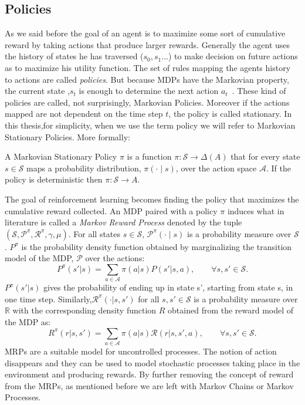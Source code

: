 \subsection{Policies}
As we said before the goal of an agent is to maximize some sort of cumulative reward by taking actions that produce larger rewards. Generally the agent uses the history of states he has traversed ($s_0, s_1...$) to make decision on future actions as to maximize his utility function. The set of rules mapping the agents history to actions are called \emph{policies}. But because MDPs have the Markovian property, the current state ,$s_t$ is enough to determine the next action $a_t$~\cite{Sutton:1998:IRL:551283}. These kind of policies are called, not surprisingly, Markovian Policies. Moreover if the actions mapped are not dependent on the time step $t$, the policy is called stationary. In this thesis,for simplicity, when we use the term policy we will refer to Markovian Stationary Policies. More formally:
\begin{definition}
	A Markovian Stationary Policy $\pi$ is a function $\pi:\mathcal{S}\rightarrow \Delta(A)$ that for every state $s \in \mathcal{S}$ maps a probability distribution, $\pi(\cdot \mid s)$, over the action space $\mathcal{A}$. If the policy is deterministic then $\pi:\mathcal{S}\rightarrow A$.
\end{definition}
The goal of reinforcement learning becomes finding the policy that maximizes the cumulative reward collected.
An MDP paired with a policy $\pi$ induces what in literature is called a \emph{Markov Reward Process} denoted by the tuple $\mathcal{(S,P^\pi,R^\pi,\gamma,\mu)}$. For all states $s \in \mathcal{S}$, $\mathcal{P^\pi}(\cdot \mid s)$ is a probability measure over $\mathcal{S}$. $P^\pi$ is the probability density function obtained by marginalizing the transition model of the MDP, $\mathcal{P}$ over the actions:
\begin{equation}
	P^\pi(s'|s)=\sum_{a \in \mathcal{A}} \pi(a|s)P(s'|s,a), \qquad \forall s,s' \in \mathcal{S}.
\end{equation}
$P^\pi(s'|s)$ gives the probability of ending up in state s', starting from state s, in one time step. Similarly,$\mathcal{R^\pi}(\cdot|s,s′)$ for all $s,s′\in \mathcal{S}$ is a probability measure over $\mathbb{R}$ with the corresponding density function $R$ obtained from the reward model of the MDP as:
\begin{equation}
	R^\pi(r|s,s')=\sum_{a \in \mathcal{A}} \pi(a|s)\mathcal{R}(r|s,s',a), \qquad \forall s,s' \in \mathcal{S}.
\end{equation}
MRPs are a suitable model for uncontrolled processes. The notion of action disappears and they can be used to model stochastic processes taking place in the environment and producing rewards. By further removing the concept of reward from the MRPs, as mentioned before we are left with Markov Chains or Markov Processes.
